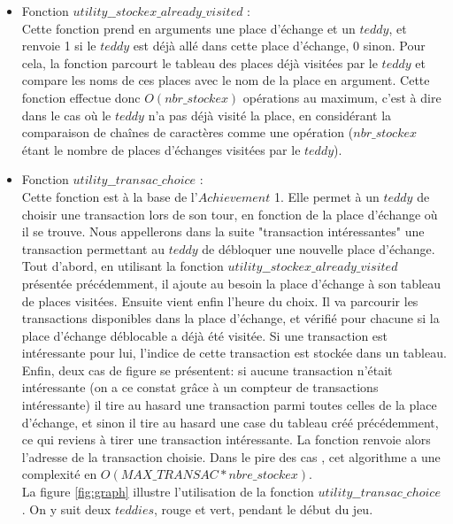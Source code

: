 \documentclass{article}
\begin{document}
\begin{itemize}
    

\item Fonction $utility\_\_stockex\_already\_visited$ :\\
Cette fonction prend en arguments une place d'échange et un $teddy$, et renvoie 1 si le $teddy$ est déjà allé dans cette place d'échange, 0 sinon. Pour cela, la fonction parcourt le tableau des places déjà visitées par le $teddy$ et compare les noms de ces places avec le nom de la place en argument. Cette fonction effectue donc $O(nbr\_stockex)$ opérations au maximum, c'est à dire dans le cas où le $teddy$ n'a pas déjà visité la place, en considérant la comparaison de chaînes de caractères comme une opération ($nbr\_stockex$ étant le nombre de places d'échanges visitées par le $teddy$).


\item Fonction $utility\_\_transac\_choice$ :\\
Cette fonction est à la base de l'$Achievement$ 1. Elle permet à un $teddy$ de choisir une transaction lors de son tour, en fonction de la place d'échange où il se trouve. Nous appellerons dans la suite "transaction intéressantes" une transaction permettant au $teddy$ de débloquer une nouvelle place d'échange.\\
Tout d'abord, en utilisant la fonction $utility\_\_stockex\_already\_visited$ présentée précédemment, il ajoute au besoin la place d'échange à son tableau de places visitées. Ensuite vient enfin l'heure du choix. Il va parcourir les transactions disponibles dans la place d'échange, et vérifié pour chacune si la place d'échange déblocable a déjà été visitée. Si une transaction est intéressante pour lui, l'indice de cette transaction est stockée dans un tableau. Enfin, deux cas de figure se présentent: si aucune transaction n'était intéressante (on a ce constat grâce à un compteur de transactions intéressante) il tire au hasard une transaction parmi toutes celles de la place d'échange, et sinon il tire au hasard une case du tableau créé précédemment, ce qui reviens à tirer une transaction intéressante. La fonction renvoie alors l'adresse de la transaction choisie. Dans le pire des cas , cet algorithme a une complexité en $O(MAX\_TRANSAC * nbre\_stockex)$. \\ 

La figure \ref{fig:graph} illustre l'utilisation de la fonction $utility\_\_transac\_choice$ . On y suit deux $teddies$, rouge et vert, pendant le début du jeu. 


\end{itemize}
\end{document}
